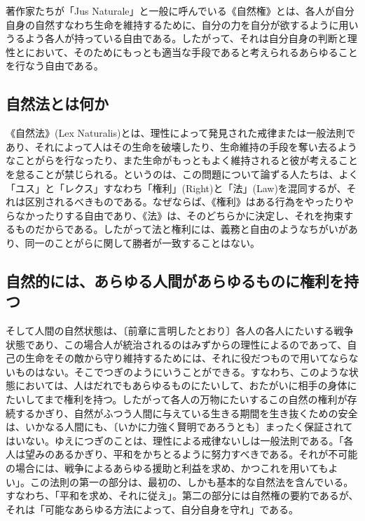 著作家たちが「Jus Naturale」と一般に呼んでいる《自然権》とは、各人が自分自身の自然すなわち生命を維持するために、自分の力を自分が欲するように用いうるよう各人が持っている自由である。したがって、それは自分自身の判断と理性とにおいて、そのためにもっとも適当な手段であると考えられるあらゆることを行なう自由である。



\subsection{自然法とは何か}


《自然法》(Lex Naturalis)とは、理性によって発見された戒律または一般法則であり、それによって人はその生命を破壊したり、生命維持の手段を奪い去るようなことがらを行なったり、また生命がもっともよく維持されると彼が考えることを怠ることが禁じられる。というのは、この問題について論ずる人たちは、よく「ユス」と「レクス」すなわち「権利」(Right)と「法」(Law)を混同するが、それは区別されるべきものである。なぜならば、《権利》はある行為をやったりやらなかったりする自由であり、《法》は、そのどちらかに決定し、それを拘束するものだからである。したがって法と権利には、義務と自由のようなちがいがあり、同一のことがらに関して勝者が一致することはない。

\subsection{自然的には、あらゆる人間があらゆるものに権利を持つ}


そして人間の自然状態は、〔前章に言明したとおり〕各人の各人にたいする戦争状態であり、この場合人が統治されるのはみずからの理性によるのであって、自己の生命をその敵から守り維持するためには、それに役だつもので用いてならないものはない。そこでつぎのようにいうことができる。すなわち、このような状態においては、人はだれでもあらゆるものにたいして、おたがいに相手の身体にたいしてまで権利を持つ。したがって各人の万物にたいするこの自然の権利が存続するかぎり、自然がふつう人間に与えている生きる期間を生き抜くための安全は、いかなる人間にも、〔いかに力強く賢明であろうとも〕まったく保証されてはいない。ゆえにつぎのことは、理性による戒律ないしは一般法則である。「各人は望みのあるかぎり、平和をかちとるように努力すべきである。それが不可能の場合には、戦争によるあらゆる援助と利益を求め、かつこれを用いてもよい」。この法則の第一の部分は、最初の、しかも基本的な自然法を含んでいる。すなわち、「平和を求め、それに従え」。第二の部分には自然権の要約であるが、それは「可能なあらゆる方法によって、自分自身を守れ」である。

